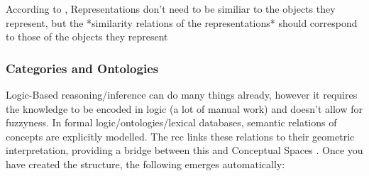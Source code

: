 
According to \cite{Gardenfors2000a}, Representations don't need to be similiar to the objects they represent, but the *similarity relations of the representations* should correspond to those of the objects they represent

\subsubsection*{Categories and Ontologies}



Logic-Based reasoning/inference can do many things already, however it requires the knowledge to be encoded in logic (a lot of manual work) and doesn't allow for fuzzyness.
In formal logic/ontologies/lexical databases, semantic relations of concepts are explicitly modelled. The \gls{rcc} \cite{Cohn1997a} links these relations to their geometric interpretation, providing a bridge between this and Conceptual Spaces \cite{Gardenfors2001}. Once you have created the structure, the following emerges automatically:

\vspace{2ex}

